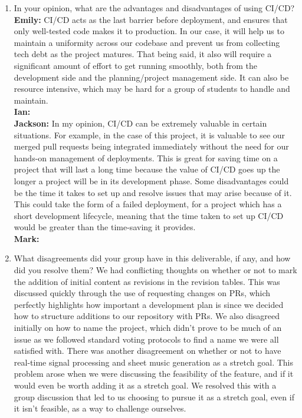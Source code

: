 \documentclass{article}
\begin{document}
\begin{enumerate}
    \item In your opinion, what are the advantages and disadvantages of using
    CI/CD?\\
    \textbf{Emily:} CI/CD acts as the last barrier before deployment, and ensures that only well-tested code makes it to production. In our case, it will help 
                    us to maintain a uniformity across our codebase and prevent us from collecting tech debt as the project matures. That being said, it also will 
                    require a significant amount of effort to get running smoothly, both from the development side and the planning/project management side. It 
                    can also be resource intensive, which may be hard for a group of students to handle and maintain.  \\
    \textbf{Ian:} \\
    \textbf{Jackson:} In my opinion, CI/CD can be extremely valuable in certain situations. For example, in the case of this project, it is valuable to see our merged pull requests 
                      being integrated immediately without the need for our hands-on management of deployments. This is great for saving time on a project that will last a long time because the value 
                      of CI/CD goes up the longer a project will be in its development phase. Some disadvantages could be the time it takes to set up and resolve issues that may arise because of it. 
                      This could take the form of a failed deployment, for a project which has a short development lifecycle, meaning that the time taken to set up CI/CD would be greater than the time-saving it provides.\\
    \textbf{Mark:} \\
    
    \item What disagreements did your group have in this deliverable, if any,
    and how did you resolve them?
    We had conflicting thoughts on whether or not to mark the addition of initial content as revisions in the revision tables. This was discussed quickly through the use of requesting changes on PRs, which 
    perfectly highlights how important a development plan is since we decided how to structure additions to our repository with PRs. We also disagreed initially on how to name the project, which didn’t prove 
    to be much of an issue as we followed standard voting protocols to find a name we were all satisfied with. There was another disagreement on whether or not to have real-time signal processing and sheet music 
    generation as a stretch goal. This problem arose when we were discussing the feasibility of the feature, and if it would even be worth adding it as a stretch goal. We resolved this with a group discussion that 
    led to us choosing to pursue it as a stretch goal, even if it isn’t feasible, as a way to challenge ourselves.

\end{enumerate}
\end{document}
